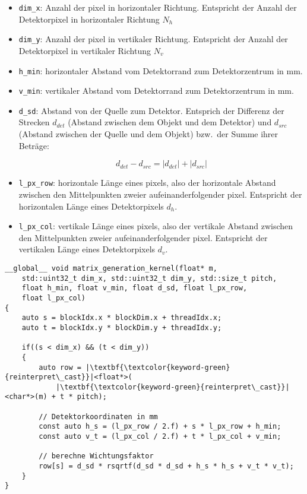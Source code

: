 \begin{itemize}
    \item \texttt{dim\_x}: Anzahl der \gls{pixel} in horizontaler Richtung. Entspricht der Anzahl der Detektorpixel in
          horizontaler Richtung $N_h$
    \item \texttt{dim\_y}: Anzahl der \gls{pixel} in vertikaler Richtung. Entspricht der Anzahl der Detektorpixel in
          vertikaler Richtung $N_v$
    \item \texttt{h\_min}: horizontaler Abstand vom Detektorrand zum Detektorzentrum in mm.
    \item \texttt{v\_min}: vertikaler Abstand vom Detektorrand zum Detektorzentrum in mm.
    \item \texttt{d\_sd}: Abstand von der Quelle zum Detektor. Entsprich der Differenz der Strecken $d_{det}$ (Abstand
          zwischen dem Objekt und dem Detektor) und $d_{src}$ (Abstand zwischen der Quelle und dem Objekt) bzw.\ der
          Summe ihrer Beträge:
          
          \begin{equation*}
              d_{det} - d_{src} = |d_{det}| + |d_{src}|
          \end{equation*}

    \item \texttt{l\_px\_row}: horizontale Länge eines \gls{pixel}s, also der horizontale Abstand zwischen den
          Mittelpunkten zweier aufeinanderfolgender \gls{pixel}. Entspricht der horizontalen Länge eines Detektorpixels
          $d_h$.
    \item \texttt{l\_px\_col}: vertikale Länge eines \gls{pixel}s, also der vertikale Abstand zwischen den
          Mittelpunkten zweier aufeinanderfolgender \gls{pixel}. Entspricht der vertikalen Länge eines Detektorpixels
          $d_v$.
\end{itemize}

\begin{code}
\begin{verbatim}
__global__ void matrix_generation_kernel(float* m,
    std::uint32_t dim_x, std::uint32_t dim_y, std::size_t pitch,
    float h_min, float v_min, float d_sd, float l_px_row,
    float l_px_col)
{
    auto s = blockIdx.x * blockDim.x + threadIdx.x;
    auto t = blockIdx.y * blockDim.y + threadIdx.y;

    if((s < dim_x) && (t < dim_y))
    {
        auto row = |\textbf{\textcolor{keyword-green}{reinterpret\_cast}}|<float*>(
            |\textbf{\textcolor{keyword-green}{reinterpret\_cast}}|<char*>(m) + t * pitch);

        // Detektorkoordinaten in mm
        const auto h_s = (l_px_row / 2.f) + s * l_px_row + h_min;
        const auto v_t = (l_px_col / 2.f) + t * l_px_col + v_min;

        // berechne Wichtungsfaktor
        row[s] = d_sd * rsqrtf(d_sd * d_sd + h_s * h_s + v_t * v_t);
    }
}
\end{verbatim}
\label{source:impl_gen_mat}
\end{code}

